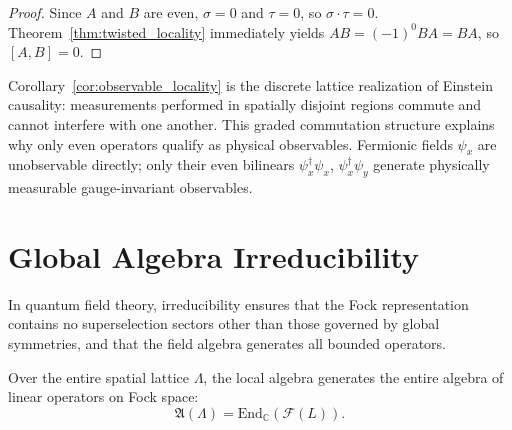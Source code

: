 \begin{proof}
Since $A$ and $B$ are even, $\sigma = 0$ and $\tau = 0$, so $\sigma \cdot \tau = 0$. Theorem~\ref{thm:twisted_locality} immediately yields $A B = (-1)^0 B A = B A$, so $[A, B] = 0$.
\end{proof}

\begin{remark}
Corollary~\ref{cor:observable_locality} is the discrete lattice realization of Einstein causality: measurements performed in spatially disjoint regions commute and cannot interfere with one another. This graded commutation structure explains why only even operators qualify as physical observables. Fermionic fields $\psi_x$ are unobservable directly; only their even bilinears $\psi_x^\dagger \psi_x$, $\psi_x^\dagger \psi_y$ generate physically measurable gauge-invariant observables.
\end{remark}

\section{Global Algebra Irreducibility}

In quantum field theory, irreducibility ensures that the Fock representation contains no superselection sectors other than those governed by global symmetries, and that the field algebra generates all bounded operators.

\begin{theorem}
\label{thm:global_irreducibility}
Over the entire spatial lattice $\Lambda$, the local algebra generates the entire algebra of linear operators on Fock space:
\begin{equation}
\mathfrak{A}(\Lambda) = \mathrm{End}_{\mathbb{C}}(\mathcal{F}(L)).
\end{equation}
\end{theorem}

